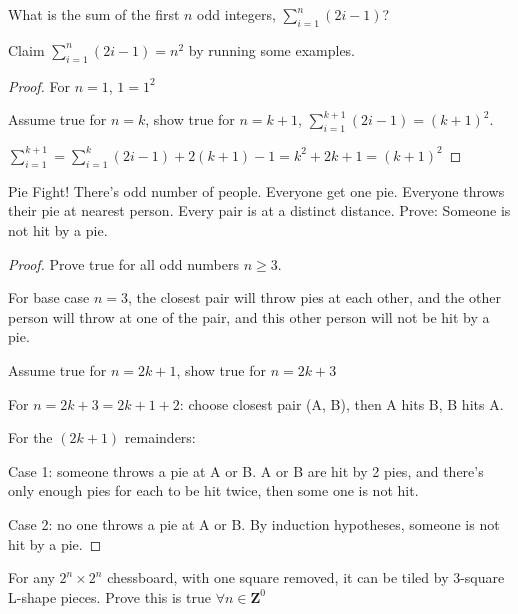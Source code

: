 \begin{ex}

What is the sum of the first $n$ odd integers, $\sum_{i = 1}^n (2i - 1)$?

Claim $\sum_{i = 1}^n (2i - 1) = n^2$ by running some examples.

\end{ex}

\begin{proof}

For $n = 1$, $1 = 1^2$

Assume true for $n = k$, show true for $n = k + 1$, $\sum_{i = 1}^{k + 1}(2i - 1) = (k + 1)^2$.

$\sum_{i = 1}^{k + 1} = \sum_{i = 1}^k (2i - 1) + 2(k + 1) - 1 = k^2 + 2k + 1 = (k + 1)^2$

\end{proof}

\begin{ex}

Pie Fight! There's odd number of people. Everyone get one pie. Everyone throws their pie at nearest person. Every pair is at a distinct distance. Prove: Someone is not hit by a pie.

\end{ex}

\begin{proof}

Prove true for all odd numbers $n \geq 3$.

For base case $n = 3$, the closest pair will throw pies at each other, and the other person will throw at one of the pair, and this other person will not be hit by a pie.

Assume true for $n = 2k + 1$, show true for $n = 2k + 3$

For $n = 2k + 3 = 2k + 1 + 2$: choose closest pair (A, B), then A hits B, B hits A. 

For the $(2k + 1)$ remainders:

Case 1: someone throws a pie at A or B. A or B are hit by 2 pies, and there's only enough pies for each to be hit twice, then some one is not hit.

Case 2: no one throws a pie at A or B. By induction hypotheses, someone is not hit by a pie.

\end{proof}

\begin{prob}

For any $2^n \times 2^n$ chessboard, with one square removed, it can be tiled by 3-square L-shape pieces. Prove this is true $\forall n \in \mathbf{Z}^0$

\end{prob}

